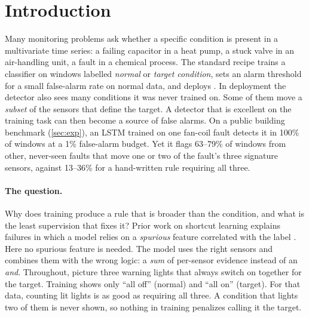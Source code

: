 \documentclass{article}
\theoremstyle{definition}
\theoremstyle{remark}
\renewcommand{\1}{\mathbf{1}}
\begin{document}
\section{Introduction}
\label{sec:intro}
Many monitoring problems ask whether a specific condition is present in a multivariate time series: a failing capacitor in a heat pump, a stuck valve in an air-handling unit, a fault in a chemical process. The standard recipe trains a classifier on windows labelled \emph{normal} or \emph{target condition}, sets an alarm threshold for a small false-alarm rate on normal data, and deploys \citep{katipamula2005,zhao2019,venkatasubramanian2003}. In deployment the detector also sees many conditions it was never trained on. Some of them move a \emph{subset} of the sensors that define the target. A detector that is excellent on the training task can then become a source of false alarms. On a public building benchmark (\cref{sec:exp}), an LSTM trained on one fan-coil fault detects it in 100\% of windows at a 1\% false-alarm budget. Yet it flags 63--79\% of windows from other, never-seen faults that move one or two of the fault's three signature sensors, against 13--36\% for a hand-written rule requiring all three.

\paragraph{The question.} Why does training produce a rule that is broader than the condition, and what is the least supervision that fixes it? Prior work on shortcut learning explains failures in which a model relies on a \emph{spurious} feature correlated with the label \citep{geirhos2020,shah2020,hermann2024}. Here no spurious feature is needed. The model uses the right sensors and combines them with the wrong logic: a \emph{sum} of per-sensor evidence instead of an \emph{and}. Throughout, picture three warning lights that always switch on together for the target. Training shows only ``all off'' (normal) and ``all on'' (target). For that data, counting lit lights is as good as requiring all three. A condition that lights two of them is never shown, so nothing in training penalizes calling it the target.
\end{document}
